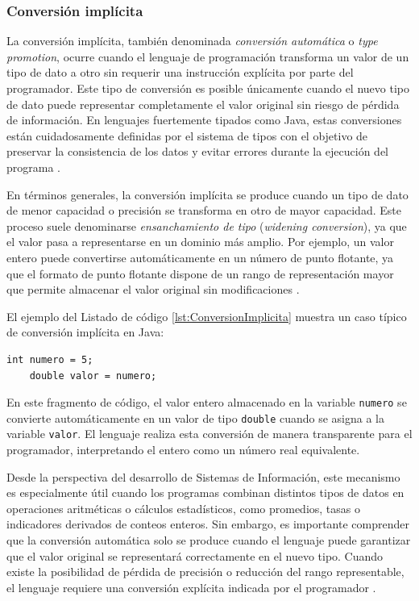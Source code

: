 \documentclass[12pt,twoside]{book}
\begin{document}
					\subsubsection{Conversión implícita}
						\noindent
						La conversión implícita, también denominada \textit{conversión automática} o \textit{type promotion}, ocurre cuando el lenguaje de programación transforma un valor de un tipo de dato a otro sin requerir una instrucción explícita por parte del programador. Este tipo de conversión es posible únicamente cuando el nuevo tipo de dato puede representar completamente el valor original sin riesgo de pérdida de información. En lenguajes fuertemente tipados como Java, estas conversiones están cuidadosamente definidas por el sistema de tipos con el objetivo de preservar la consistencia de los datos y evitar errores durante la ejecución del programa \cite{Sebesta2018Concepts,Pierce2002Types}.
						
						En términos generales, la conversión implícita se produce cuando un tipo de dato de menor capacidad o precisión se transforma en otro de mayor capacidad. Este proceso suele denominarse \textit{ensanchamiento de tipo} (\textit{widening conversion}), ya que el valor pasa a representarse en un dominio más amplio. Por ejemplo, un valor entero puede convertirse automáticamente en un número de punto flotante, ya que el formato de punto flotante dispone de un rango de representación mayor que permite almacenar el valor original sin modificaciones \cite{Bloch2018EffectiveJava}.
						
						El ejemplo del Listado de código \ref{lst:ConversionImplicita} muestra un caso típico de conversión implícita en Java:
						
						\begin{lstlisting}[style=Java,caption={Conversión Implícita de Datos.},label={lst:ConversionImplicita}]
	int numero = 5;
	double valor = numero; \end{lstlisting}
						
						\noindent
						En este fragmento de código, el valor entero almacenado en la variable \texttt{numero} se convierte automáticamente en un valor de tipo \texttt{double} cuando se asigna a la variable \texttt{valor}. El lenguaje realiza esta conversión de manera transparente para el programador, interpretando el entero como un número real equivalente.
						
						Desde la perspectiva del desarrollo de Sistemas de Información, este mecanismo es especialmente útil cuando los programas combinan distintos tipos de datos en operaciones aritméticas o cálculos estadísticos, como promedios, tasas o indicadores derivados de conteos enteros. Sin embargo, es importante comprender que la conversión automática solo se produce cuando el lenguaje puede garantizar que el valor original se representará correctamente en el nuevo tipo. Cuando existe la posibilidad de pérdida de precisión o reducción del rango representable, el lenguaje requiere una conversión explícita indicada por el programador \cite{Sebesta2018Concepts,Pressman2019Software}.
						
\end{document}
